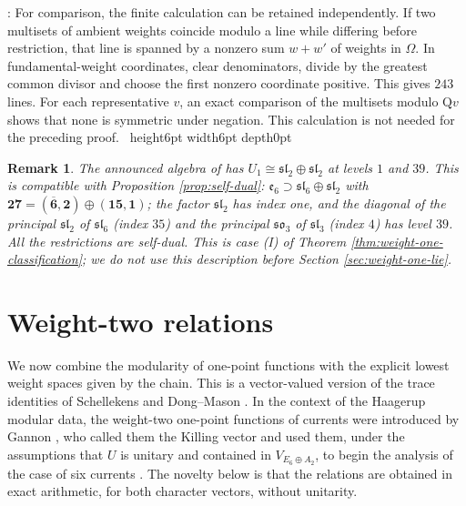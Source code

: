 \documentclass[leqno]{article}
\newcommand{\Q}{\mathrm{Q}}
\newcommand{\qed}{\hfill \vrule height6pt  width6pt depth0pt}
\newtheorem{remark}[thm]{Remark}
\newenvironment{proof}[1][]{\noindent {\it Proof #1} : }{\hbox{~}\qed
\smallskip
}
\numberwithin{equation}{section}
\begin{document}
\begin{proof}
For comparison, the finite calculation can be retained independently. If two multisets of ambient weights coincide modulo a line while differing before restriction, that line is spanned by a nonzero sum $w+w'$ of weights in $\Omega$. In fundamental-weight coordinates, clear denominators, divide by the greatest common divisor and choose the first nonzero coordinate positive. This gives $243$ lines. For each representative $v$, an exact comparison of the multisets modulo $\Q v$ shows that none is symmetric under negation. This calculation is not needed for the preceding proof.
\end{proof}

\begin{remark}\normalfont
\label{rem:announced-fits}
The announced algebra of \cite{Rie26,Hua26} has $U_1 \cong \mathfrak{sl}_2 \oplus \mathfrak{sl}_2$ at levels $1$ and $39$. This is compatible with Proposition \ref{prop:self-dual}: $\mathfrak e_6 \supset \mathfrak{sl}_6 \oplus \mathfrak{sl}_2$ with $\mathbf{27} = (\overline{\mathbf 6},\mathbf 2) \oplus (\mathbf{15},\mathbf 1)$; the factor $\mathfrak{sl}_2$ has index one, and the diagonal of the principal $\mathfrak{sl}_2$ of $\mathfrak{sl}_6$ (index $35$) and the principal $\mathfrak{so}_3$ of $\mathfrak{sl}_3$ (index $4$) has level $39$. All the restrictions are self-dual. This is case (I) of Theorem \ref{thm:weight-one-classification}; we do not use this description before Section \ref{sec:weight-one-lie}.
\end{remark}

\section{Weight-two relations}
\label{sec:weight-two}

We now combine the modularity of one-point functions with the explicit lowest weight spaces given by the chain. This is a vector-valued version of the trace identities of Schellekens \cite{Sch93} and Dong--Mason \cite{DoM04b}. In the context of the Haagerup modular data, the weight-two one-point functions of currents were introduced by Gannon \cite[Section 2.4]{Gan19}, who called them the Killing vector and used them, under the assumptions that $U$ is unitary and contained in $V_{E_6 \oplus A_2}$, to begin the analysis of the case of six currents \cite[Section 3.3]{Gan19}. The novelty below is that the relations are obtained in exact arithmetic, for both character vectors, without unitarity.
\end{document}
